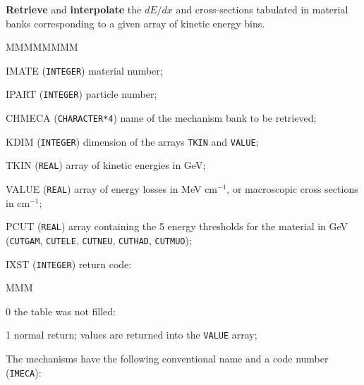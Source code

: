         
 
 
{\bf Retrieve} and {\bf interpolate} the $dE/dx$ and cross-sections
tabulated in material banks corresponding to a given array of kinetic
energy bins. 

\begin{DLtt}{MMMMMMMM}
\item[IMATE]     ({\tt INTEGER}) material number;
\item[IPART]     ({\tt INTEGER}) particle number;
\item[CHMECA] ({\tt CHARACTER*4}) name of the mechanism bank to be retrieved;
\item[KDIM]  ({\tt INTEGER}) dimension of the arrays {\tt TKIN} and {\tt VALUE};
\item[TKIN]   ({\tt REAL}) array of kinetic energies in GeV;
\item [VALUE]    ({\tt REAL}) array of energy losses in MeV cm$^{-1}$, 
or macroscopic cross sections in cm$^{-1}$;
\item[PCUT]({\tt REAL}) array containing the 5 energy thresholds for the material
in GeV ({\tt CUTGAM}, {\tt CUTELE}, {\tt CUTNEU}, {\tt CUTHAD}, {\tt CUTMUO});
\item[IXST] ({\tt INTEGER}) return code:
\begin{DLtt}{MMM}
\item[0]   the table was not filled:
\item[1]   normal return;
values are returned into the {\tt VALUE} array;
\end{DLtt}
\end{DLtt}

The mechanisms have the following
conventional name and a code number ({\tt IMECA}):
 
